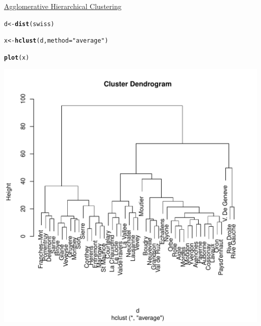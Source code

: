 \documentclass[11pt, a4paper]{article}\usepackage[]{graphicx}\usepackage[]{xcolor}
\makeatletter
\def\maxwidth{ %
  \ifdim\Gin@nat@width>\linewidth
    \linewidth
  \else
    \Gin@nat@width
  \fi
}
\newcommand{\hlsng}[1]{\textcolor[rgb]{0.192,0.494,0.8}{#1}}%
\newcommand{\hldef}[1]{\textcolor[rgb]{0.345,0.345,0.345}{#1}}%
\newcommand{\hlkwb}[1]{\textcolor[rgb]{0.69,0.353,0.396}{#1}}%
\newcommand{\hlkwc}[1]{\textcolor[rgb]{0.333,0.667,0.333}{#1}}%
\newcommand{\hlkwd}[1]{\textcolor[rgb]{0.737,0.353,0.396}{\textbf{#1}}}%
\newenvironment{kframe}{%
 \def\at@end@of@kframe{}%
 \ifinner\ifhmode%
  \def\at@end@of@kframe{\end{minipage}}%
  \begin{minipage}{\columnwidth}%
 \fi\fi%
 \def\FrameCommand##1{\hskip\@totalleftmargin \hskip-\fboxsep
 \colorbox{shadecolor}{##1}\hskip-\fboxsep
     \hskip-\linewidth \hskip-\@totalleftmargin \hskip\columnwidth}%
 \MakeFramed {\advance\hsize-\width
   \@totalleftmargin\z@ \linewidth\hsize
   \@setminipage}}%
 {\par\unskip\endMakeFramed%
 \at@end@of@kframe}
\newenvironment{knitrout}{}{} %
\makeatother
\begin{document}
\faArrowAltCircleRight[regular] \hspace{0.2cm} \underline{Agglomerative Hierarchical Clustering}

\begin{knitrout}
\color{fgcolor}\begin{kframe}
\begin{alltt}
\hldef{d} \hlkwb{<-} \hlkwd{dist}\hldef{(swiss)}

\hldef{x} \hlkwb{<-} \hlkwd{hclust}\hldef{(d,} \hlkwc{method} \hldef{=} \hlsng{"average"}\hldef{)}

\hlkwd{plot}\hldef{(x)}
\end{alltt}
\end{kframe}
\includegraphics[width=\maxwidth]{figure/unnamed-chunk-3-1} 
\end{knitrout}
\end{document}
